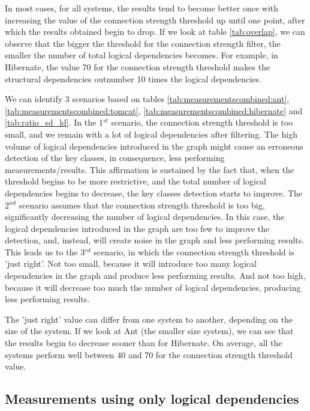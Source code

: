 \documentclass[runningheads]{comsis2}
\begin{document}
In most cases, for all systems, the results tend to become better once with increasing the value of the connection strength threshold up until one point, after which the results obtained begin to drop.
If we look at table \ref{tab:overlap}, we can observe that the bigger the threshold for the connection strength filter, the smaller the number of total logical dependencies becomes. For example, in Hibernate, the value 70 for the connection strength threshold makes the structural dependencies outnumber 10 times the logical dependencies. 

We can identify 3 scenarios based on tables \ref{tab:measurementscombined:ant}, \ref{tab:measurementscombined:tomcat}, \ref{tab:measurementscombined:hibernate} and \ref{tab:ratio_sd_ld}. In the 1$^{st}$ scenario, the connection strength threshold is too small, and we remain with a lot of logical dependencies after filtering. The high volume of logical dependencies introduced in the graph might cause an erroneous detection of the key classes, in consequence, less performing measurements/results. This affirmation is sustained by the fact that, when the threshold begins to be more restrictive, and the total number of logical dependencies begins to decrease, the key classes detection starts to improve.
The 2$^{nd}$ scenario assumes that the connection strength threshold is too big, significantly decreasing the number of logical dependencies. In this case, the logical dependencies introduced in the graph are too few to improve the detection, and, instead, will create noise in the graph and less performing results.
This leads us to the 3$^{rd}$ scenario, in which the connection strength threshold is 'just right'. Not too small, because it will introduce too many logical dependencies in the graph and produce less performing results. And not too high, because it will decrease too much the number of logical dependencies, producing less performing results. 

The 'just right' value can differ from one system to another, depending on the size of the system. If we look at Ant (the smaller size system), we can see that the results begin to decrease sooner than for Hibernate. On average, all the systems perform well between 40 and 70 for the connection strength threshold value.




\subsection{Measurements using only logical dependencies}
\label{sec:measure_ld}
\end{document}
